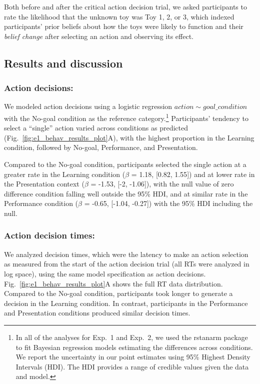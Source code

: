 \documentclass[10pt, letterpaper]{article}
\begin{document}
Both before and after the critical action decision trial, we asked
participants to rate the likelihood that the unknown toy was Toy 1, 2,
or 3, which indexed participants' prior beliefs about how the toys were
likely to function and their \emph{belief change} after selecting an
action and observing its effect.

\subsection{Results and discussion}\label{results-and-discussion}

\subsubsection{Action decisions:}\label{action-decisions}

We modeled action decisions using a logistic regression
\texttt{$action \sim goal\_condition$} with the No-goal condition as the
reference
category.\footnote{In all of the analyses for Exp.\ 1 and Exp.\ 2, we used the {\selectfont rstanarm} package to fit Bayesian regression models estimating the differences across conditions. We report the uncertainty in our point estimates using 95\% Highest Density Intervals (HDI). The HDI provides a range of credible values given the data and model.}
Participants' tendency to select a ``single'' action varied across
conditions as predicted (Fig.~\ref{fig:e1_behav_results_plot}A), with
the highest proportion in the Learning condition, followed by No-goal,
Performance, and Presentation.

Compared to the No-goal condition, participants selected the single
action at a greater rate in the Learning condition (\(\beta\) = 1.18,
{[}0.82, 1.55{]}) and at lower rate in the Presentation context
(\(\beta\) = -1.53, {[}-2, -1.06{]}), with the null value of zero
difference condition falling well outside the 95\% HDI, and at similar
rate in the Performance condition (\(\beta\) = -0.65, {[}-1.04,
-0.27{]}) with the 95\% HDI including the null.

\subsubsection{Action decision times:}\label{action-decision-times}

We analyzed decision times, which were the latency to make an action
selection as measured from the start of the action decision trial (all
RTs were analyzed in log space), using the same model specification as
action decisions. Fig.~\ref{fig:e1_behav_results_plot}A shows the full
RT data distribution. Compared to the No-goal condition, participants
took longer to generate a decision in the Learning condition. In
contrast, participants in the Performance and Presentation conditions
produced similar decision times.
\end{document}
